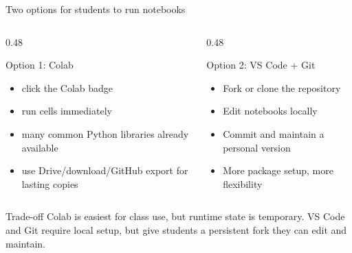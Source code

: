 \documentclass[aspectratio=169,11pt]{beamer}
\begin{document}
\begin{frame}{Two options for students to run notebooks}
  \begin{columns}[T,totalwidth=\textwidth]
    \begin{column}{0.48\textwidth}
      \begin{block}{Option 1: Colab}
        \begin{itemize}
          \item click the Colab badge
          \item run cells immediately
          \item many common Python libraries already available
          \item use Drive/download/GitHub export for lasting copies
        \end{itemize}
      \end{block}
    \end{column}
    \begin{column}{0.48\textwidth}
      \begin{block}{Option 2: VS Code + Git}
        \begin{itemize}
          \item Fork or clone the repository
          \item Edit notebooks locally
          \item Commit and maintain a personal version
          \item More package setup, more flexibility
        \end{itemize}
      \end{block}
    \end{column}
  \end{columns}
  \vspace{0.35cm}
  \begin{block}{Trade-off}
    Colab is easiest for class use, but runtime state is temporary. VS Code and Git require local setup, but give students a persistent fork they can edit and maintain.
  \end{block}
\end{frame}
\end{document}
